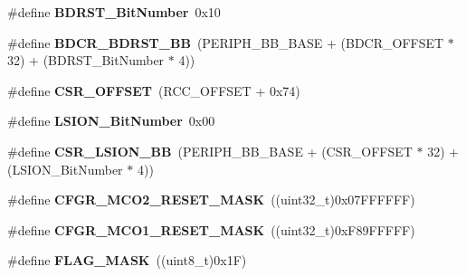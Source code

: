 \begin{DoxyCompactItemize}
\item 
\hypertarget{group___r_c_c_gae6718158034388d8fde8caaa28ffe8b9}{\#define {\bfseries B\-D\-R\-S\-T\-\_\-\-Bit\-Number}~0x10}\label{group___r_c_c_gae6718158034388d8fde8caaa28ffe8b9}

\item 
\hypertarget{group___r_c_c_ga892fdf297b85b85cbaf0723649b31818}{\#define {\bfseries B\-D\-C\-R\-\_\-\-B\-D\-R\-S\-T\-\_\-\-B\-B}~(P\-E\-R\-I\-P\-H\-\_\-\-B\-B\-\_\-\-B\-A\-S\-E + (B\-D\-C\-R\-\_\-\-O\-F\-F\-S\-E\-T $\ast$ 32) + (B\-D\-R\-S\-T\-\_\-\-Bit\-Number $\ast$ 4))}\label{group___r_c_c_ga892fdf297b85b85cbaf0723649b31818}

\item 
\hypertarget{group___r_c_c_ga984cbe73312b6d3d355c5053763d499a}{\#define {\bfseries C\-S\-R\-\_\-\-O\-F\-F\-S\-E\-T}~(R\-C\-C\-\_\-\-O\-F\-F\-S\-E\-T + 0x74)}\label{group___r_c_c_ga984cbe73312b6d3d355c5053763d499a}

\item 
\hypertarget{group___r_c_c_ga3f9dbe50769ce2a63ae12520433b9b40}{\#define {\bfseries L\-S\-I\-O\-N\-\_\-\-Bit\-Number}~0x00}\label{group___r_c_c_ga3f9dbe50769ce2a63ae12520433b9b40}

\item 
\hypertarget{group___r_c_c_gaa253e36e7e5fb02998c0e4d0388abc52}{\#define {\bfseries C\-S\-R\-\_\-\-L\-S\-I\-O\-N\-\_\-\-B\-B}~(P\-E\-R\-I\-P\-H\-\_\-\-B\-B\-\_\-\-B\-A\-S\-E + (C\-S\-R\-\_\-\-O\-F\-F\-S\-E\-T $\ast$ 32) + (L\-S\-I\-O\-N\-\_\-\-Bit\-Number $\ast$ 4))}\label{group___r_c_c_gaa253e36e7e5fb02998c0e4d0388abc52}

\item 
\hypertarget{group___r_c_c_gabd7dd9cf31a9cc27fd9c0c1624f9a298}{\#define {\bfseries C\-F\-G\-R\-\_\-\-M\-C\-O2\-\_\-\-R\-E\-S\-E\-T\-\_\-\-M\-A\-S\-K}~((uint32\-\_\-t)0x07\-F\-F\-F\-F\-F\-F)}\label{group___r_c_c_gabd7dd9cf31a9cc27fd9c0c1624f9a298}

\item 
\hypertarget{group___r_c_c_ga51f5130a66963090dc02b4ebd47e2f83}{\#define {\bfseries C\-F\-G\-R\-\_\-\-M\-C\-O1\-\_\-\-R\-E\-S\-E\-T\-\_\-\-M\-A\-S\-K}~((uint32\-\_\-t)0x\-F89\-F\-F\-F\-F\-F)}\label{group___r_c_c_ga51f5130a66963090dc02b4ebd47e2f83}

\item 
\hypertarget{group___r_c_c_ga890221cb651a3f30f6d1bca0d9b0e13d}{\#define {\bfseries F\-L\-A\-G\-\_\-\-M\-A\-S\-K}~((uint8\-\_\-t)0x1\-F)}\label{group___r_c_c_ga890221cb651a3f30f6d1bca0d9b0e13d}


\end{DoxyCompactItemize}

